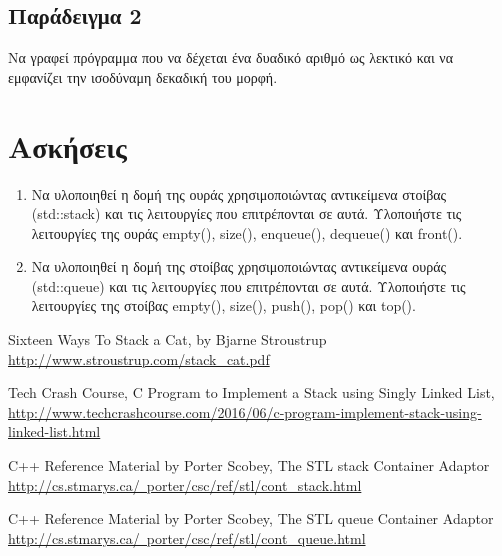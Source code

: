 

\subsection{Παράδειγμα 2}
Να γραφεί πρόγραμμα που να δέχεται ένα δυαδικό αριθμό ως λεκτικό και να εμφανίζει την ισοδύναμη δεκαδική του μορφή.





\section{Ασκήσεις}
\begin{enumerate}
\item Να υλοποιηθεί η δομή της ουράς χρησιμοποιώντας αντικείμενα στοίβας (std::stack) και τις λειτουργίες που επιτρέπονται σε αυτά. Υλοποιήστε τις λειτουργίες της ουράς empty(), size(), enqueue(), dequeue() και front().
\item Να υλοποιηθεί η δομή της στοίβας χρησιμοποιώντας αντικείμενα ουράς (std::queue) και τις λειτουργίες που επιτρέπονται σε αυτά. Υλοποιήστε τις λειτουργίες της στοίβας empty(), size(), push(), pop() και top().
\end{enumerate}

\begin{thebibliography}{9}
Sixteen Ways To Stack a Cat, by Bjarne Stroustrup \href{http://www.stroustrup.com/stack_cat.pdf}{http://www.stroustrup.com/stack\_cat.pdf}

Tech Crash Course,  C Program to Implement a Stack using Singly Linked List, \href{http://www.techcrashcourse.com/2016/06/c-program-implement-stack-using-linked-list.html}{http://www.techcrashcourse.com/2016/06/c-program-implement-stack-using-linked-list.html}

C++ Reference Material by Porter Scobey, The STL stack Container Adaptor \href{http://cs.stmarys.ca/~porter/csc/ref/stl/cont_stack.html}{http://cs.stmarys.ca/~porter/csc/ref/stl/cont\_stack.html}

C++ Reference Material by Porter Scobey, The STL queue Container Adaptor \href{http://cs.stmarys.ca/~porter/csc/ref/stl/cont_queue.html}{http://cs.stmarys.ca/~porter/csc/ref/stl/cont\_queue.html}

\end{thebibliography}

